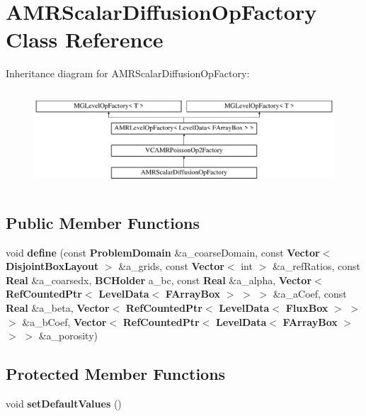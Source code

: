 \hypertarget{class_a_m_r_scalar_diffusion_op_factory}{}\section{A\+M\+R\+Scalar\+Diffusion\+Op\+Factory Class Reference}
\label{class_a_m_r_scalar_diffusion_op_factory}
Inheritance diagram for A\+M\+R\+Scalar\+Diffusion\+Op\+Factory\+:\begin{figure}[H]
\begin{center}
\leavevmode
\includegraphics[height=3.648208cm]{class_a_m_r_scalar_diffusion_op_factory}
\end{center}
\end{figure}
\subsection*{Public Member Functions}
\begin{DoxyCompactItemize}
\item 
\mbox{\label{class_a_m_r_scalar_diffusion_op_factory_a808721630414d4f937fc92df123a1f1e}} 
void {\bfseries define} (const \textbf{ Problem\+Domain} \&a\+\_\+coarse\+Domain, const \textbf{ Vector}$<$ \textbf{ Disjoint\+Box\+Layout} $>$ \&a\+\_\+grids, const \textbf{ Vector}$<$ int $>$ \&a\+\_\+ref\+Ratios, const \textbf{ Real} \&a\+\_\+coarsedx, \textbf{ B\+C\+Holder} a\+\_\+bc, const \textbf{ Real} \&a\+\_\+alpha, \textbf{ Vector}$<$ \textbf{ Ref\+Counted\+Ptr}$<$ \textbf{ Level\+Data}$<$ \textbf{ F\+Array\+Box} $>$ $>$ $>$ \&a\+\_\+a\+Coef, const \textbf{ Real} \&a\+\_\+beta, \textbf{ Vector}$<$ \textbf{ Ref\+Counted\+Ptr}$<$ \textbf{ Level\+Data}$<$ \textbf{ Flux\+Box} $>$ $>$ $>$ \&a\+\_\+b\+Coef, \textbf{ Vector}$<$ \textbf{ Ref\+Counted\+Ptr}$<$ \textbf{ Level\+Data}$<$ \textbf{ F\+Array\+Box} $>$ $>$ $>$ \&a\+\_\+porosity)
\end{DoxyCompactItemize}
\subsection*{Protected Member Functions}
\begin{DoxyCompactItemize}
\item 
\mbox{\label{class_a_m_r_scalar_diffusion_op_factory_ac3585f4d566aa5cded637f4d38d7ae48}} 
void {\bfseries set\+Default\+Values} ()
\end{DoxyCompactItemize}
